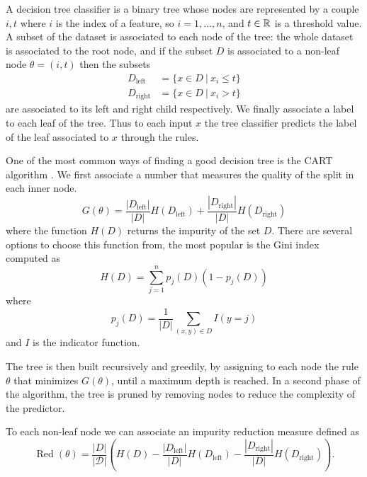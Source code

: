 \documentclass[]{marticle}
\newcommand{\ds}{\mathcal{D}}
\DeclareMathOperator{\Red}{Red}
\begin{document}
A decision tree classifier is a binary tree whose nodes are represented by a couple $i, t$ where $i$
is the index of a feature, so $i=1,\dots,n$, and $t\in\mathbb{R}$ is a threshold value. A subset of the
dataset is associated to each node of the tree: the whole dataset is associated to the root node,
and if the subset $D$ is associated to a non-leaf node $\theta = (i, t)$ then the subsets
\begin{align*}
    D_\text{left}  &= \{x \in D \ |\ x_i \leq t\} \\
    D_\text{right} &= \{x \in D \ |\ x_i >    t\}
\end{align*}
are associated to its left and right child respectively. We finally associate a label to each leaf
of the tree. Thus to each input $x$ the tree classifier predicts the label of the leaf associated to
$x$ through the rules.

One of the most common ways of finding a good decision tree is the CART algorithm
\cite{tibsharani-elements}. We first associate a number that measures the quality of the split in
each inner node.
\begin{equation*}
    G(\theta) = \frac{|D_\text{left}|}{|D|} H(D_\text{left}) + \frac{|D_\text{right}|}{|D|}
    H(D_\text{right})
\end{equation*}
where the function $H(D)$ returns the impurity of the set $D$. There are several options to choose
this function from, the most popular is the Gini index computed as 
\begin{equation*}
    H(D) = \sum_{j=1}^n p_j(D)\left(1-p_j(D)\right)
\end{equation*}
where
\begin{equation*}
    p_j(D) = \frac{1}{|D|}\sum_{(x,y)\in D}I(y = j)
\end{equation*}
and $I$ is the indicator function.

The tree is then built recursively and greedily, by assigning to each node the rule $\theta$ that
minimizes $G(\theta)$, until a maximum depth is reached. In a second phase of the algorithm, the
tree is pruned by removing nodes to reduce the complexity of the predictor.

To each non-leaf node we can associate an impurity reduction measure defined as 
\begin{equation*}
    \Red(\theta) = \frac{|D|}{|\ds|} \left( H(D) - \frac{|D_\text{left}|}{|D|}H(D_\text{left})  -
    \frac{|D_\text{right}|}{|D|}H(D_\text{right}) \right).
\end{equation*}
\end{document}
